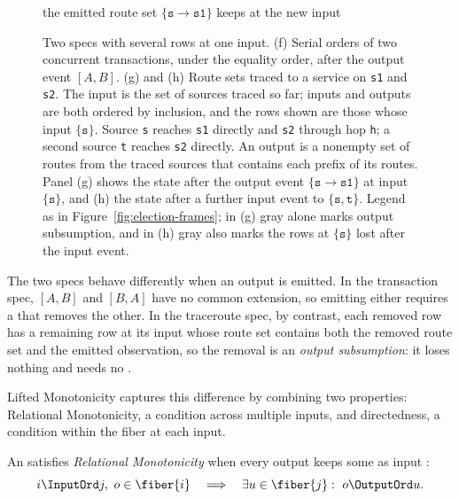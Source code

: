 \begin{figure}[t]
\begin{minipage}[t]{0.405\textwidth}
    {\footnotesize the emitted route set $\{\texttt{s}{\to}\texttt{s1}\}$ keeps \outnouns at the new input}
  \end{minipage}
  \caption{Two specs with several rows at one input.  (f) Serial orders of two
  concurrent transactions, under the equality order, after the output event
  $[A,B]$.  (g) and (h) Route sets traced to a service on \texttt{s1} and
  \texttt{s2}.  The input is the set of sources traced so far; inputs and
  outputs are both ordered by inclusion, and the rows shown are those whose
  input \inrel $\{\texttt{s}\}$.  Source \texttt{s} reaches \texttt{s1} directly and
  \texttt{s2} through hop \texttt{h}; a second source \texttt{t} reaches
  \texttt{s2} directly.  An output is a nonempty set of routes from the traced
  sources that contains each prefix of its routes.  Panel (g) shows the state
  after the output event $\{\texttt{s}{\to}\texttt{s1}\}$ at input
  $\{\texttt{s}\}$, and (h) the state after a further input event to
  $\{\texttt{s},\texttt{t}\}$.  Legend as in Figure~\ref{fig:election-frames};
  in (g) gray alone marks output subsumption, and in (h) gray also marks the
  rows at $\{\texttt{s}\}$ lost after the input event.}
  \label{fig:ambiguity-frames}
\end{figure}

The two specs behave differently when an output is emitted.  In the transaction
spec, $[A,B]$ and $[B,A]$ have no common extension, so emitting either requires a
\commitment that removes the other.  In the traceroute spec, by contrast, each
removed row has a remaining row at its input whose route set contains both the
removed route set and the emitted observation, so the removal is an
\emph{output subsumption}: it loses nothing and needs no \commitment.

Lifted Monotonicity captures this difference by combining two properties:
Relational Monotonicity, a condition across multiple inputs, and directedness,
a condition within the fiber at each input.

\label{sec:lifted-monotonicity}
\begin{definition}
\label{def:relational-monotonicity}
An \spectype satisfies \emph{Relational Monotonicity}
when every output keeps some \outnoun as input \ingrows:
        \begin{equation}
  i\InputOrd j,\ o\in\fiber{i}
  \quad\Longrightarrow\quad
  \exists u\in\fiber{j}:\ o\OutputOrd u.
  \label{eq:relational-monotonicity}
        \end{equation}
\end{definition}


